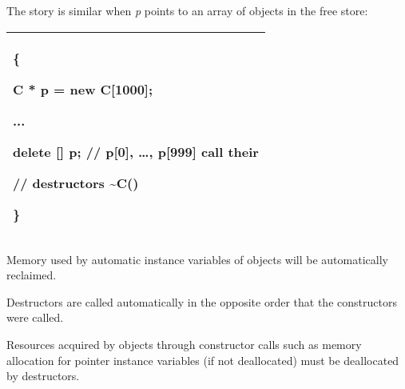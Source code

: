 \documentclass[
]{article}
\begin{document}
The story is similar when \emph{p} points to an array of objects in the
free store:

\begin{longtable}[]{@{}l@{}}
\toprule
\endhead
\begin{minipage}[t]{0.97\columnwidth}\raggedright
\{

C * p = new C{[}1000{]};

...

delete {[}{]} p; // p{[}0{]}, \ldots, p{[}999{]} call their

// destructors \textasciitilde C()

\}\strut
\end{minipage}\tabularnewline
\bottomrule
\end{longtable}

Memory used by automatic instance variables of objects will be
automatically reclaimed.

Destructors are called automatically in the opposite order that the
constructors were called.

Resources acquired by objects through constructor calls such as memory
allocation for pointer instance variables (if not deallocated) must be
deallocated by destructors.
\end{document}
